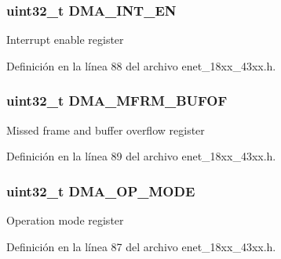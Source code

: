 \subsubsection[{\texorpdfstring{D\+M\+A\+\_\+\+I\+N\+T\+\_\+\+EN}{DMA_INT_EN}}]{ uint32\+\_\+t D\+M\+A\+\_\+\+I\+N\+T\+\_\+\+EN}\hypertarget{struct_l_p_c___e_n_e_t___t_a1705fa63c0fcd4956a9ee77118a5a15b}{}\label{struct_l_p_c___e_n_e_t___t_a1705fa63c0fcd4956a9ee77118a5a15b}
Interrupt enable register 

Definición en la línea 88 del archivo enet\+\_\+18xx\+\_\+43xx.\+h.

\subsubsection[{\texorpdfstring{D\+M\+A\+\_\+\+M\+F\+R\+M\+\_\+\+B\+U\+F\+OF}{DMA_MFRM_BUFOF}}]{ uint32\+\_\+t D\+M\+A\+\_\+\+M\+F\+R\+M\+\_\+\+B\+U\+F\+OF}\hypertarget{struct_l_p_c___e_n_e_t___t_ab2843bad2081373b2b9383feed5e0352}{}\label{struct_l_p_c___e_n_e_t___t_ab2843bad2081373b2b9383feed5e0352}
Missed frame and buffer overflow register 

Definición en la línea 89 del archivo enet\+\_\+18xx\+\_\+43xx.\+h.

\subsubsection[{\texorpdfstring{D\+M\+A\+\_\+\+O\+P\+\_\+\+M\+O\+DE}{DMA_OP_MODE}}]{ uint32\+\_\+t D\+M\+A\+\_\+\+O\+P\+\_\+\+M\+O\+DE}\hypertarget{struct_l_p_c___e_n_e_t___t_a576c7b0d576806210b164aaf6387a1df}{}\label{struct_l_p_c___e_n_e_t___t_a576c7b0d576806210b164aaf6387a1df}
Operation mode register 

Definición en la línea 87 del archivo enet\+\_\+18xx\+\_\+43xx.\+h.

